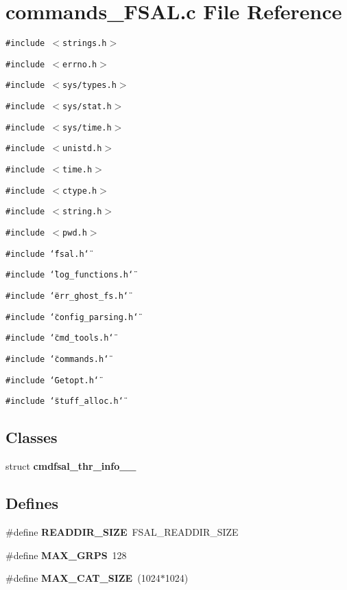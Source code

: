 \section{commands\_\-FSAL.c File Reference}
\label{commands__FSAL_8c}
{\tt \#include $<$strings.h$>$}\par
{\tt \#include $<$errno.h$>$}\par
{\tt \#include $<$sys/types.h$>$}\par
{\tt \#include $<$sys/stat.h$>$}\par
{\tt \#include $<$sys/time.h$>$}\par
{\tt \#include $<$unistd.h$>$}\par
{\tt \#include $<$time.h$>$}\par
{\tt \#include $<$ctype.h$>$}\par
{\tt \#include $<$string.h$>$}\par
{\tt \#include $<$pwd.h$>$}\par
{\tt \#include \char`\"{}fsal.h\char`\"{}}\par
{\tt \#include \char`\"{}log\_\-functions.h\char`\"{}}\par
{\tt \#include \char`\"{}err\_\-ghost\_\-fs.h\char`\"{}}\par
{\tt \#include \char`\"{}config\_\-parsing.h\char`\"{}}\par
{\tt \#include \char`\"{}cmd\_\-tools.h\char`\"{}}\par
{\tt \#include \char`\"{}commands.h\char`\"{}}\par
{\tt \#include \char`\"{}Getopt.h\char`\"{}}\par
{\tt \#include \char`\"{}stuff\_\-alloc.h\char`\"{}}\par
\subsection*{Classes}
\begin{CompactItemize}
\item 
struct {\bf cmdfsal\_\-thr\_\-info\_\-\_\-}
\end{CompactItemize}
\subsection*{Defines}
\begin{CompactItemize}
\item 
\#define {\bf READDIR\_\-SIZE}\ FSAL\_\-READDIR\_\-SIZE
\item 
\#define {\bf MAX\_\-GRPS}\ 128
\item 
\#define {\bf MAX\_\-CAT\_\-SIZE}\ (1024$\ast$1024)
\end{CompactItemize}
